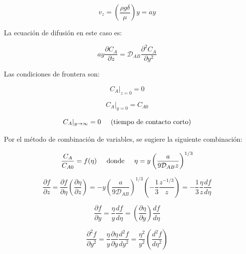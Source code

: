 \begin{equation}
	v_z = \left( \frac{\rho g \delta}{\mu} \right) y = ay
\end{equation}

La ecuación de difusión en este caso es:

\begin{equation} \label{eq: manrefx10.1}
	ay \frac{\partial C_A}{\partial z} = \mathcal{D}_{AB} \frac{\partial^2 C_A}{\partial y^2}
\end{equation}

Las condiciones de frontera son:

\begin{equation}
	C_A|_{z=0} = 0
\end{equation}

\begin{equation}
	C_A|_{y=0} = C_{A0}
\end{equation}

\begin{equation}
	C_A|_{y \to \infty} = 0 \hspace{0.5cm} \text{(tiempo de contacto corto)}
\end{equation}

Por el método de combinación de variables, se sugiere la siguiente combinación:

\begin{equation} \label{eq: manrefx11}
	\frac{C_A}{C_{A0}} = f(\eta) \hspace{0.5cm} \text{donde} \hspace{0.5cm} \eta = y \left( \frac{a}{9 \mathcal{D}_{AB}z} \right)^{1/3}
\end{equation}

\begin{equation}
	\frac{\partial f}{\partial z} = \frac{\partial f}{\partial \eta} \left( \frac{\partial \eta}{\partial z} \right) = - y \left( \frac{a}{9 \mathcal{D}_{AB}} \right)^{1/3} \left( - \frac{1}{3} \frac{z^{-1/3}}{z} \right) = - \frac{1}{3} \frac{\eta}{z} \frac{d f}{d \eta}
\end{equation}

$$
\frac{\partial f}{\partial y} = \frac{\eta}{y} \frac{df}{d\eta} = \left( \frac{\partial \eta}{\partial y} \right) \frac{d f}{d \eta}
$$

\begin{equation} \label{eq: manrefx12}
	\frac{\partial^2 f}{\partial y^2} = \frac{\eta}{y} \frac{\partial \eta}{\partial y} \frac{d^2 f}{d y^2} = \frac{\eta^2}{y^2} \left( \frac{d^2 f}{d \eta^2} \right)
\end{equation}

